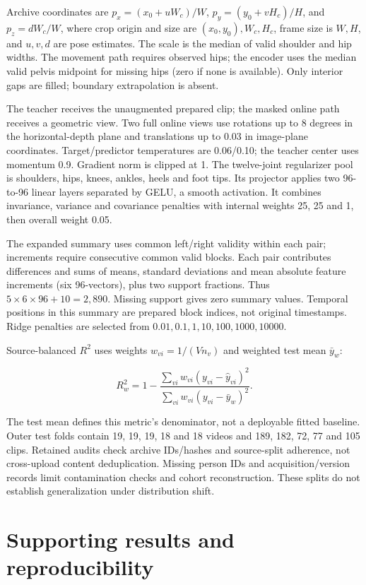 \documentclass{article}
\begin{document}
Archive coordinates are \(p_x=(x_0+uW_c)/W\), \(p_y=(y_0+vH_c)/H\), and
\(p_z=dW_c/W\), where crop origin and size are \((x_0,y_0),W_c,H_c\),
frame size is \(W,H\), and \(u,v,d\) are pose estimates. The scale is
the median of valid shoulder and hip widths. The movement path requires
observed hips; the encoder uses the median valid pelvis midpoint for
missing hips (zero if none is available). Only interior gaps are filled;
boundary extrapolation is absent.

The teacher receives the unaugmented prepared clip; the masked online
path receives a geometric view. Two full online views use rotations up
to 8 degrees in the horizontal-depth plane and translations up to 0.03
in image-plane coordinates. Target/predictor temperatures are 0.06/0.10;
the teacher center uses momentum 0.9. Gradient norm is clipped at 1. The
twelve-joint regularizer pool is shoulders, hips, knees, ankles, heels
and foot tips. Its projector applies two 96-to-96 linear layers
separated by GELU, a smooth activation. It combines invariance, variance
and covariance penalties with internal weights 25, 25 and 1, then
overall weight 0.05.

The expanded summary uses common left/right validity within each pair;
increments require consecutive common valid blocks. Each pair
contributes differences and sums of means, standard deviations and mean
absolute feature increments (six 96-vectors), plus two support
fractions. Thus \(5\times6\times96+10=2,890\). Missing support gives
zero summary values. Temporal positions in this summary are prepared
block indices, not original timestamps. Ridge penalties are selected
from \(0.01,0.1,1,10,100,1000,10000\).

Source-balanced \(R^2\) uses weights \(w_{vi}=1/(Vn_v)\) and weighted
test mean \(\bar y_w\):

\[R_w^2=1-\frac{\sum_{vi}w_{vi}(y_{vi}-\hat y_{vi})^2}{\sum_{vi}w_{vi}(y_{vi}-\bar y_w)^2}.\]

The test mean defines this metric's denominator, not a deployable fitted
baseline. Outer test folds contain 19, 19, 19, 18 and 18 videos and 189,
182, 72, 77 and 105 clips. Retained audits check archive IDs/hashes and
source-split adherence, not cross-upload content deduplication. Missing
person IDs and acquisition/version records limit contamination checks
and cohort reconstruction. These splits do not establish generalization
under distribution shift.

\section{Supporting results and
reproducibility}\label{supporting-results-and-reproducibility}
\end{document}
